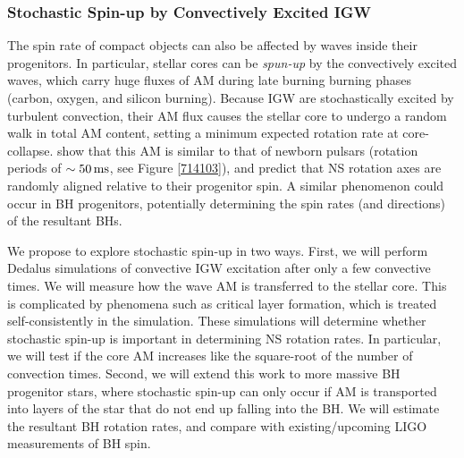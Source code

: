 \subsubsection{Stochastic Spin-up by Convectively Excited IGW}

The spin rate of compact objects can also be affected by waves inside their progenitors. In particular, stellar cores can be {\it spun-up} by the convectively excited waves, which carry huge fluxes of AM during late burning burning phases (carbon, oxygen, and silicon burning). Because IGW are stochastically excited by turbulent convection, their AM flux causes the stellar core to undergo a random walk in total AM content, setting a minimum expected rotation rate at core-collapse. \cite{fullerwave:15} show that this AM is similar to that of newborn pulsars (rotation periods of $\sim 50 \, {\rm ms}$, see Figure \ref{714103}), and predict that NS rotation axes are randomly aligned relative to their progenitor spin. A similar phenomenon could occur in BH progenitors, potentially determining the spin rates (and directions) of the resultant BHs.

We propose to explore stochastic spin-up in two ways. First, we will perform Dedalus simulations of convective IGW excitation after only a few convective times. We will measure how the wave AM is transferred to the stellar core. This is complicated by phenomena such as critical layer formation, which is treated self-consistently in the simulation. These simulations will determine whether stochastic spin-up is important in determining NS rotation rates. In particular, we will test if the core AM increases like the square-root of the number of convection times. Second, we will extend this work to more massive BH progenitor stars, where stochastic spin-up can only occur if AM is transported into layers of the star that do not end up falling into the BH. We will estimate the resultant BH rotation rates, and compare with existing/upcoming LIGO measurements of BH spin.

